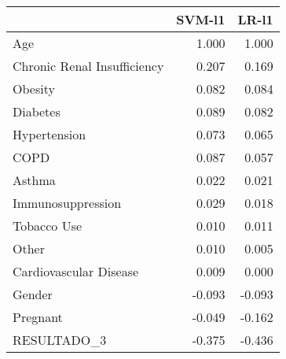 \begin{tabular}{lrr}
\toprule
{} &  SVM-l1 &  LR-l1 \\
\midrule
Age                         &   1.000 &  1.000 \\
Chronic Renal Insufficiency &   0.207 &  0.169 \\
Obesity                     &   0.082 &  0.084 \\
Diabetes                    &   0.089 &  0.082 \\
Hypertension                &   0.073 &  0.065 \\
COPD                        &   0.087 &  0.057 \\
Asthma                      &   0.022 &  0.021 \\
Immunosuppression           &   0.029 &  0.018 \\
Tobacco Use                 &   0.010 &  0.011 \\
Other                       &   0.010 &  0.005 \\
Cardiovascular Disease      &   0.009 &  0.000 \\
Gender                      &  -0.093 & -0.093 \\
Pregnant                    &  -0.049 & -0.162 \\
RESULTADO\_3                 &  -0.375 & -0.436 \\
\bottomrule
\end{tabular}
